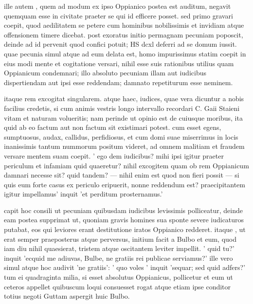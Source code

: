  ille autem , quem ad modum ex ipso Oppianico postea est auditum, negavit quemquam esse in civitate praeter se qui id efficere posset. sed primo gravari coepit, quod aedilitatem se petere cum hominibus nobilissimis et invidiam atque offensionem timere dicebat. post exoratus initio permagnam pecuniam poposcit, deinde ad id pervenit quod confici potuit; HS dcxl deferri ad se domum iussit. quae pecunia simul atque ad eum delata est, homo impurissimus statim coepit in eius modi mente et cogitatione versari, nihil esse suis rationibus utilius quam Oppianicum condemnari; illo absoluto pecuniam illam aut iudicibus dispertiendam aut ipsi esse reddendam; damnato repetiturum esse neminem.

 itaque rem excogitat singularem. atque haec, iudices, quae vera dicuntur a nobis facilius credetis, si cum animis vestris longo intervallo recordari C. Gaii Staieni vitam et naturam volueritis; nam perinde ut opinio est de cuiusque moribus, ita quid ab eo factum aut non factum sit existimari potest. cum esset egens, sumptuosus, audax, callidus, perfidiosus, et cum domi suae miserrimus in locis inanissimis tantum nummorum positum videret, ad omnem malitiam et fraudem versare mentem suam coepit. ' ego dem iudicibus? mihi ipsi igitur praeter periculum et infamiam quid quaeretur? nihil excogitem quam ob rem Oppianicum damnari necesse sit? quid tandem? — nihil enim est quod non fieri possit — si quis eum forte casus ex periculo eripuerit, nonne reddendum est? praecipitantem igitur impellamus' inquit 'et perditum prosternamus.'

 capit hoc consili ut pecuniam quibusdam iudicibus levissimis polliceatur, deinde eam postea supprimat ut, quoniam gravis homines sua sponte severe iudicaturos putabat, eos qui leviores erant destitutione iratos Oppianico redderet. itaque , ut erat semper praeposterus atque perversus, initium facit a Bulbo et eum, quod iam diu nihil quaesierat, tristem atque oscitantem leviter impellit. ' quid tu?' inquit 'ecquid me adiuvas, Bulbe, ne gratiis rei publicae serviamus?' ille vero simul atque hoc audivit 'ne gratiis': ' quo voles ' inquit 'sequar; sed quid adfers?' tum ei quadraginta milia, si esset absolutus Oppianicus, pollicetur et eum ut ceteros appellet quibuscum loqui consuesset rogat atque etiam ipse conditor totius negoti Guttam aspergit huic Bulbo.


